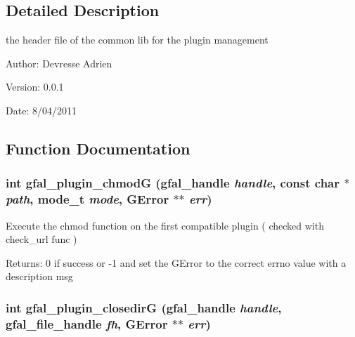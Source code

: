 \subsection{Detailed Description}
the header file of the common lib for the plugin management 

\begin{Desc}
\item[Author:]Devresse Adrien \end{Desc}
\begin{Desc}
\item[Version:]0.0.1 \end{Desc}
\begin{Desc}
\item[Date:]8/04/2011 \end{Desc}


\subsection{Function Documentation}
\subsubsection{\setlength{\rightskip}{0pt plus 5cm}int gfal\_\-plugin\_\-chmod\-G (gfal\_\-handle {\em handle}, const char $\ast$ {\em path}, mode\_\-t {\em mode}, GError $\ast$$\ast$ {\em err})}\label{gfal__common__plugin_8h_f9780b8c4a097a65b42aee466a9218e0}


Execute the chmod function on the first compatible plugin ( checked with check\_\-url func ) \begin{Desc}
\item[Returns:]0 if success or -1 and set the GError to the correct errno value with a description msg \end{Desc}
\subsubsection{\setlength{\rightskip}{0pt plus 5cm}int gfal\_\-plugin\_\-closedir\-G (gfal\_\-handle {\em handle}, gfal\_\-file\_\-handle {\em fh}, GError $\ast$$\ast$ {\em err})}\label{gfal__common__plugin_8h_980a66f9ea2946189c0d70f13471900f}


